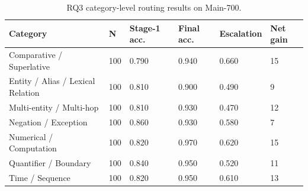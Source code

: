 \begin{table}[htbp]
\centering
\caption{RQ3 category-level routing results on Main-700.}
\label{tab:rq3-categories}
\begin{tabular}{llllll}
\toprule
Category & N & Stage-1 acc. & Final acc. & Escalation & Net gain \\
\midrule
Comparative / Superlative & 100 & 0.790 & 0.940 & 0.660 & 15 \\
Entity / Alias / Lexical Relation & 100 & 0.810 & 0.900 & 0.490 & 9 \\
Multi-entity / Multi-hop & 100 & 0.810 & 0.930 & 0.470 & 12 \\
Negation / Exception & 100 & 0.860 & 0.930 & 0.580 & 7 \\
Numerical / Computation & 100 & 0.820 & 0.970 & 0.620 & 15 \\
Quantifier / Boundary & 100 & 0.840 & 0.950 & 0.520 & 11 \\
Time / Sequence & 100 & 0.820 & 0.950 & 0.610 & 13 \\
\bottomrule
\end{tabular}
\end{table}
